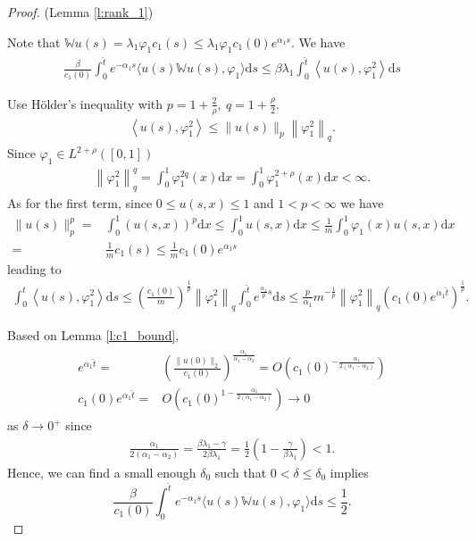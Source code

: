 \documentclass{article}
\renewcommand{\d}{\mathrm{d}}
\newcommand{\W}{\mathbb{W}}
\newcommand{\1}[1]{{\mathds{1}}_{\left\{#1\right\}}}
\begin{document}
\begin{proof}(Lemma \ref{l:rank_1})
	
	Note that $\W u(s)=\lambda_1 \varphi_1 c_1(s) \leq  \lambda_1 \varphi_1 c_1(0)e^{\alpha_1 s}.$ We have
	\begin{align*}
		\frac{\beta }{c_1(0)}\int_{0}^{\hat{t}}e^{-\alpha_1 s} \langle u(s) \W u(s), \varphi_1 \rangle \d s \leq  \beta \lambda_1 \int_{0}^{\hat{t}} \left \langle u(s) , \varphi_1^2 \right \rangle \d s
	\end{align*}
	
	Use Hölder's inequality with $p=1+\frac{2}{\rho}, \ q=1+\frac{\rho}{2}.$
	\begin{align*}
		\left \langle u(s) , \varphi_1^2 \right \rangle \leq \|u(s) \|_p \left \|\varphi_1^2 \right \|_q.
	\end{align*}
	Since $\varphi_1 \in L^{2+\rho}([0,1])$
	\begin{align*}
		\left \|\varphi_1^2 \right \|_q^q=\int_{0}^{1} \varphi_1^{2q}(x) \d x=\int_{0}^{1} \varphi_1^{2+\rho}(x) \d x<\infty.
	\end{align*}
	As for the first term, since $0 \leq u(s,x) \leq 1$ and $1<p<\infty$ we have
	\begin{align*}
		\|u(s) \|_p^p=&\int_{0}^{1}\left(u(s,x) \right)^p \d x \leq \int_{0}^{1}u(s,x) \d x \leq \frac{1}{m} \int_{0}^{1}\varphi_1(x)u(s,x) \d x\\
		=&\frac{1}{m}c_1(s) \leq \frac{1}{m}c_1(0)e^{\alpha_1 s}
	\end{align*}
	leading to
	\begin{align*}
		\int_{0}^{\hat{t}} \left \langle u(s) , \varphi_1^2 \right \rangle \d s \leq \left(\frac{c_1(0)}{m} \right)^{\frac{1}{p}}\left \| \varphi_1^2 \right \|_q \int_{0}^{\hat{t}} e^{\frac{\alpha_1}{p}s} \d s \leq \frac{p}{\alpha_1}m^{-\frac{1}{p}} \left \| \varphi_1^2 \right \|_q \left(c_1(0)e^{\alpha_1 \hat{t}} \right)^{\frac{1}{p}}.
	\end{align*}
	
	Based on Lemma \ref{l:c1_bound},
	\begin{align}
		\label{eq:t_hat_exponent}
		\begin{split}
			e^{\alpha_1 \hat{t}}=& \left(\frac{\| u(0)\|_2}{c_1(0)}\right)^{\frac{\alpha_1}{\alpha_1-\alpha_2}}=O \left(c_1(0)^{-\frac{\alpha_1}{2(\alpha_1-\alpha_2)}}\right)\\
			c_1(0)e^{\alpha_1 \hat{t}}=&O \left(c_1(0)^{1-\frac{\alpha_1}{2(\alpha_1-\alpha_2)}}\right) \to 0
		\end{split}
	\end{align}
	as $\delta \to 0^{+}$ since
	\begin{align*}
		\frac{\alpha_1}{2(\alpha_1-\alpha_2)}=\frac{\beta \lambda_1-\gamma}{2\beta\lambda_1}=\frac{1}{2} \left( 1-\frac{\gamma}{\beta \lambda_1}\right)<1.
	\end{align*} 
	Hence, we can find a small enough $\delta_0$ such that $0<\delta \leq \delta_0$ implies
	$$\frac{\beta}{c_1(0)}\int_{0}^{\hat{t}}e^{-\alpha_1 s} \langle u(s) \W u(s), \varphi_1 \rangle \d s \leq \frac{1}{2}. $$
\end{proof}	
\end{document}
